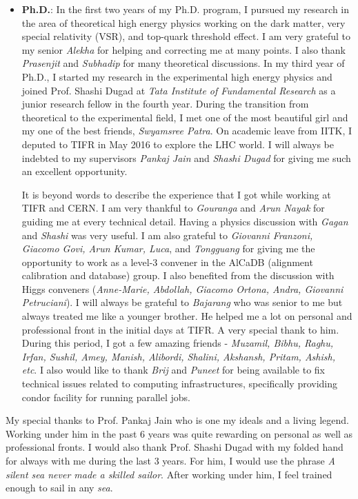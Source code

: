 \begin{itemize} [leftmargin=*]
\item \textbf{Ph.D.}: 
In the first two years of my Ph.D. program, I pursued my research in the area
of theoretical high energy physics working on the dark matter, very special
relativity (VSR), and top-quark threshold effect. I am very grateful to my senior
\textit{Alekha} for helping and correcting me at many points. I also thank 
\textit{Prasenjit} and \textit{Subhadip} for many theoretical discussions. In my 
third year of Ph.D., I started my research in the experimental high energy 
physics and joined Prof. Shashi Dugad at \textit{Tata Institute of Fundamental 
Research} as a junior research fellow in the fourth year. During the transition from theoretical 
to the experimental field, I met one of the most beautiful girl and my one of the 
best friends, \textit{Swyamsree Patra}. On academic leave from IITK, I deputed to 
TIFR in May 2016 to explore the LHC world. I will always be indebted to my 
supervisors \textit{Pankaj Jain} and \textit{Shashi Dugad} for giving me such an 
excellent opportunity.

It is beyond words to describe the experience that I got while working at TIFR
and CERN. I am very thankful to \textit{Gouranga} and \textit{Arun Nayak} for 
guiding me at every technical detail. Having a physics discussion with 
\textit{Gagan} and \textit{Shashi} was very useful. I am also grateful to 
\textit{Giovanni Franzoni, Giacomo Govi, Arun Kumar, Luca}, and \textit{Tongguang}
for giving me the opportunity to work as a level-3 convener in the AlCaDB 
(alignment calibration and database) group. I also benefited from the discussion 
with Higgs conveners (\textit{Anne-Marie, Abdollah, Giacomo Ortona, Andra, Giovanni 
Petruciani}). I will always be grateful to \textit{Bajarang} who was senior to
me but always treated me like a younger brother. He helped me a lot on personal 
and professional front in the initial days at TIFR. A very special thank to him. 
During this period, I got a few amazing friends - \textit{
Muzamil, Bibhu, Raghu, Irfan, Sushil, Amey, Manish, Alibordi, Shalini, Akshansh, Pritam, Ashish, etc}. 
I also would like to thank \textit{Brij} and \textit{Puneet} for being available to fix 
technical issues related to computing infrastructures, specifically providing 
condor facility for running parallel jobs.
\end{itemize}

My special thanks to Prof. Pankaj Jain who is one my ideals and a living legend. 
Working under him in the past 6 years was quite rewarding on personal as well 
as professional fronts. I would also thank Prof. Shashi Dugad with my folded hand 
for always with me during the last 3 years. For him, I would use the phrase 
\textit{A silent sea never made a skilled sailor}. After working under him, I feel 
trained enough to sail in any \textit{sea}.

